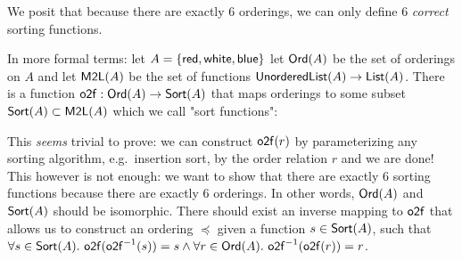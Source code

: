 We posit that because there are exactly 6 orderings, we can only define 6 \emph{correct} sorting
functions.%

In more formal terms: let $A = \{\operatorname{\mathsf{red}}, \operatorname{\mathsf{white}}, \operatorname{\mathsf{blue}}\}$
let $\operatorname{\mathsf{Ord}}(A)$ be the set of orderings on $A$ and let 
 $\operatorname{\mathsf{M2L}}(A)$  be the set of functions $\operatorname{\mathsf{UnorderedList}}(A) \to \operatorname{\mathsf{List}}(A)$.
There is a function $\operatorname{\mathsf{o2f}} : \operatorname{\mathsf{Ord}}(A) \to \operatorname{\mathsf{Sort}}(A)$ that maps orderings to
some subset $\operatorname{\mathsf{Sort}}(A) \subset \operatorname{\mathsf{M2L}}(A)$ which we call "sort functions":

\begin{center}
\end{center}

This \textit{seems} trivial to prove: we can construct $\operatorname{\mathsf{o2f}}(r)$ by parameterizing
any sorting algorithm, e.g.\ insertion sort, by the order relation $r$ and we are done!
This however is not enough: we want to show that there are exactly 6 sorting functions because
there are exactly 6 orderings. In other words, $\operatorname{\mathsf{Ord}}(A)$ and $\operatorname{\mathsf{Sort}}(A)$ should be
isomorphic. There should exist an inverse mapping to $\operatorname{\mathsf{o2f}}$ that allows us to construct
an ordering $\preccurlyeq$ given a function $s \in \operatorname{\mathsf{Sort}}(A)$, such that
$\forall s \in \operatorname{\mathsf{Sort}}(A).\, \operatorname{\mathsf{o2f}}(\operatorname{\mathsf{o2f}}^{-1}(s)) = s \land \forall r \in \operatorname{\mathsf{Ord}}(A).\, \operatorname{\mathsf{o2f}}^{-1}(\operatorname{\mathsf{o2f}}(r)) = r$.

